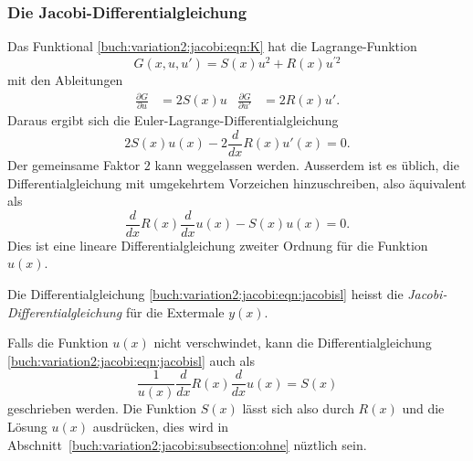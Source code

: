 %
%
\subsubsection{Die Jacobi-Differentialgleichung}
Das Funktional
\eqref{buch:variation2:jacobi:eqn:K}
hat die Lagrange-Funk\-tion 
\[
G(x,u,u') = S(x) u^2 + R(x) u^{\prime 2}
\]
mit den Ableitungen
\begin{align*}
\frac{\partial G}{\partial u}
&=
2S(x) u
&
\frac{\partial G}{\partial u'}
&=
2R(x) u'.
\end{align*}
Daraus ergibt sich die Euler-Lagrange-Differentialgleichung
\[
2S(x) u(x) - 2\frac{d}{dx} R(x) u'(x) = 0.
\]
Der gemeinsame Faktor $2$ kann weggelassen werden.
Ausserdem ist es üblich, die Differentialgleichung mit umgekehrtem
Vorzeichen hinzuschreiben, also äquivalent als
\begin{equation}
\frac{d}{dx} R(x)\frac{d}{dx} u(x) - S(x) u(x) = 0.
\label{buch:variation2:jacobi:eqn:jacobisl}
\end{equation}
Dies ist eine lineare Differentialgleichung zweiter Ordnung für die Funktion
$u(x)$.

\begin{definition}
Die Differentialgleichung
\eqref{buch:variation2:jacobi:eqn:jacobisl}
heisst die {\em Jacobi-Differentialgleichung}
für die Extermale $y(x)$.
\end{definition}

Falls die Funktion $u(x)$ nicht verschwindet, kann die Differentialgleichung
\eqref{buch:variation2:jacobi:eqn:jacobisl}
auch als
\begin{equation}
\frac{1}{u(x)}
\frac{d}{dx} R(x)\frac{d}{dx} u(x) = S(x)
\label{buch:variation2:jacobi:eqn:jacobisl2}
\end{equation}
geschrieben werden.
Die Funktion $S(x)$ lässt sich also durch $R(x)$ und die Lösung $u(x)$
ausdrücken, dies wird in
Abschnitt~\ref{buch:variation2:jacobi:subsection:ohne}
nüztlich sein.

